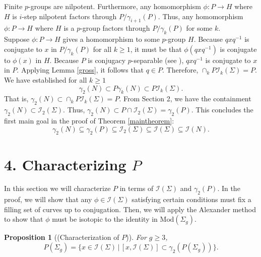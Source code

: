 \documentclass[a4paper]{amsproc}
\theoremstyle{TheoremNum}
\theoremstyle{Theorembold}
\newtheorem{prop}[thm]{Proposition}
\theoremstyle{TheoremboldDef}
\theoremstyle{TheoremboldRem}
\theoremstyle{TheoremboldRem}
\begin{document}
   Finite $p$-groups are nilpotent. Furthermore, any homomorphism $\phi:P\to H$ where $H$ is $i$-step nilpotent factors through $P/\gamma_{i+1}(P)$. Thus, any homomorphism $\phi:P\to H$ where $H$ is a $p$-group factors through $P/\gamma_{k}(P)$ for some $k$. \\  
   Suppose $\phi:P\to H$ gives a homomorphism to some $p$-group $H$. Because $q x q^{-1}$ is conjugate to $x$ in $P/\gamma_{k}(P)$ for all $k{\geqslant} 1$, it must be that $\phi (q x q^{-1})$ is conjugate to $\phi(x)$ in $H$. Because $P$ is conjugacy $p$-separable (see \cite{paris}), $q x q^{-1}$ is conjugate to $x$ in $P$.   Applying Lemma \ref{gross}, it follows that $q\in P$. Therefore, $\displaystyle \cap_k P{{\mathcal{I}}_k(\Sigma)}=P$.\\
   
   We have established for all $k{\geqslant} 1$ \[\gamma_2(N)\subset P\gamma_k(N)\subset P{{\mathcal{I}}_k(\Sigma)}.\] That is, $\gamma_2(N)\subset \cap_kP{{\mathcal{I}}_k(\Sigma)}=P$. From Section 2, we have the containment $\gamma_2(N)\subset{{\mathcal{I}}_2(\Sigma)}$. Thus, $\gamma_2(N)\subset P\cap{{\mathcal{I}}_2(\Sigma)}=\gamma_2(P)$. This concludes the first main goal in the proof of Theorem \ref{maintheorem}: \[\gamma_2(N)\subseteq\gamma_2(P)\subseteq{{\mathcal{I}}_2(\Sigma)}\subseteq{{\mathcal{I}}(\Sigma)}\subseteq{{\mathcal{I}}(N)}.\]
   
   \section*{4. Characterizing $P$}
   \addtocounter{section}{1}
   \setcounter{subsection}{0}
   In this section we will characterize $P$ in terms of ${{\mathcal{I}}(\Sigma)}$ and $\gamma_2(P)$. In the proof, we will show that any $\phi\in {{\mathcal{I}}(\Sigma)}$ satisfying certain conditions must fix a filling set of curves up to conjugation. Then, we will apply the Alexander method to show that $\phi$ must be isotopic to the identity in ${\text{Mod}(\Sigma_g)}$.
   
   \begin{prop}[(Characterization of $P$)]\label{mainprop} For $g{\geqslant} 3$,
   \[P(\Sigma_g)=\{x\in{{\mathcal{I}}(\Sigma)}\,|\, [x,{{\mathcal{I}}(\Sigma)}]\subset\gamma_2(P(\Sigma_g))\}.\]
   \end{prop}
   
\end{document}
